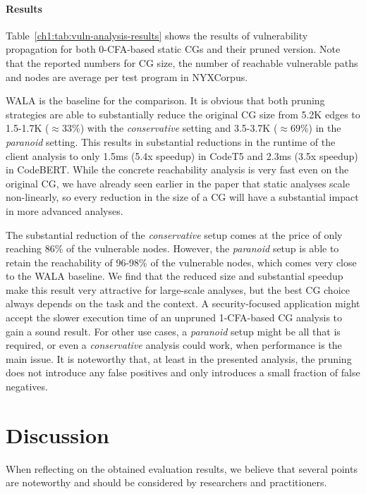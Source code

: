 \paragraph{Results}  
Table~\ref{ch1:tab:vuln-analysis-results} shows the results of vulnerability propagation for both 0-CFA-based static CGs and their pruned version. Note that the reported numbers for CG size, the number of reachable vulnerable paths and nodes are average per test program in NYXCorpus.

WALA is the baseline for the comparison.
It is obvious that both pruning strategies are able to substantially reduce the original CG size from 5.2K edges to 1.5-1.7K ($\approx 33$\%) with the \emph{conservative} setting and 3.5-3.7K ($\approx 69$\%) in the \emph{paranoid} setting.
This results in substantial reductions in the runtime of the client analysis to only 1.5ms (5.4x speedup) in CodeT5 and 2.3ms (3.5x speedup) in CodeBERT.
While the concrete reachability analysis is very fast even on the original CG, we have already seen earlier in the paper that static analyses scale non-linearly, so every reduction in the size of a CG will have a substantial impact in more advanced analyses. 

The substantial reduction of the \emph{conservative} setup comes at the price of only reaching 86\% of the vulnerable nodes.
However, the \emph{paranoid} setup is able to retain the reachability of 96-98\% of the vulnerable nodes, which comes very close to the WALA baseline.
We find that the reduced size and substantial speedup make this result very attractive for large-scale analyses, but the best CG choice always depends on the task and the context.
A security-focused application might accept the slower execution time of an unpruned 1-CFA-based CG analysis to gain a sound result.
For other use cases, a \emph{paranoid} setup might be all that is required, or even a \emph{conservative} analysis could work, when performance is the main issue.
It is noteworthy that, at least in the presented analysis, the pruning does not introduce any false positives and only introduces a small fraction of false negatives. 

\section{Discussion}\label{ch1:sec:discuss}
When reflecting on the obtained evaluation results, we believe that several points are noteworthy and should be considered by researchers and practitioners.

